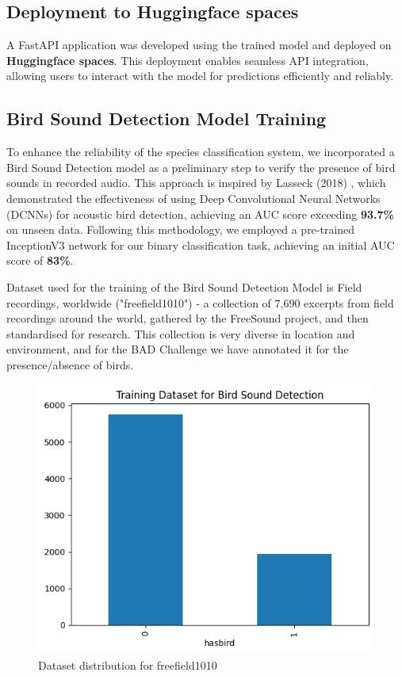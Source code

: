 \newpage
\subsection{Deployment to Huggingface spaces}
A FastAPI application was developed using the trained model and deployed on \textbf{Huggingface spaces}. This deployment enables seamless API integration, allowing users to interact with the model for predictions efficiently and reliably.


\subsection{Bird Sound Detection Model Training}

To enhance the reliability of the species classification system, we incorporated a Bird Sound Detection model as a preliminary step to verify the presence of bird sounds in recorded audio. This approach is inspired by Lasseck (2018) \cite{lasseck2018acoustic}, which demonstrated the effectiveness of using Deep Convolutional Neural Networks (DCNNs) for acoustic bird detection, achieving an AUC score exceeding \textbf{93.7\%} on unseen data. Following this methodology, we employed a pre-trained InceptionV3 network for our binary classification task, achieving an initial AUC score of \textbf{83\%}.

Dataset used for the training of the Bird Sound Detection Model is Field recordings, worldwide ("freefield1010") - a collection of 7,690 excerpts from field recordings around the world, gathered by the FreeSound project, and then standardised for research. This collection is very diverse in location and environment, and for the BAD Challenge we have annotated it for the presence/absence of birds.
\begin{figure}[h!]
    \centering
    \includegraphics[scale=0.45]{images/det_trainingdataset.png}
    \caption{Dataset distribution for freefield1010}
    \label{fig:freefield1010 dataset}
\end{figure}


